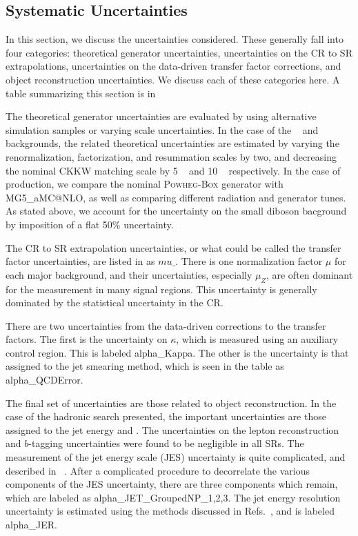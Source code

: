 \subsection{Systematic Uncertainties}

In this section, we discuss the uncertainties considered.
These generally fall into four categories: theoretical generator uncertainties, uncertainties on the CR to SR extrapolations, uncertainties on the data-driven transfer factor corrections, and object reconstruction uncertainties.
We discuss each of these categories here.
A table summarizing this section is in 


The theoretical generator uncertainties are evaluated by using alternative simulation samples or varying scale uncertainties.
In the case of the \zjets~ and \wjets~ backgrounds, the related theoretical uncertainties are estimated by varying the renormalization, factorization, and resummation scales by two, and decreasing the nominal CKKW matching scale by 5 \GeV~ and 10 \GeV~ respectively.
In the case of \ttbar production, we compare the nominal \textsc{Powheg-Box} generator with MG5\_aMC@NLO, as well as comparing different radiation and generator tunes.
As stated above, we account for the uncertainty on the small diboson bacground by imposition of a flat 50\% uncertainty.

The CR to SR extrapolation uncertainties, or what could be called the transfer factor uncertainties, are listed in  as $mu\_$.
There is one normalization factor $\mu$ for each major background, and their uncertainties, especially $\mu_Z$, are often dominant for the measurement in many signal regions.
This uncertainty is generally dominated by the statistical uncertainty in the CR.

There are two uncertainties from the data-driven corrections to the transfer factors.
The first is the uncertainty on $\kappa$, which is measured using an auxiliary \Zll control region.
This is labeled alpha\_Kappa.
The other is the uncertainty is that assigned to the jet smearing method, which is seen in the table as alpha\_QCDError.

The final set of uncertainties are those related to object reconstruction.
In the case of the hadronic search presented, the important uncertainties are those assigned to the jet energy and \met.
The uncertainties on the lepton reconstruction and $b$-tagging uncertainties were found to be negligible in all SRs.
The measurement of the jet energy scale (JES) uncertainty is quite complicated, and described in ~\cite{Aad:2011he,Aad:2012vm,ATL-PHYS-PUB-2015-015}.
After a complicated procedure to decorrelate the various components of the JES uncertainty, there are three components which remain, which are labeled as alpha\_JET\_GroupedNP\_1,2,3.
The jet energy resolution uncertainty is estimated using the methods discussed in Refs.~\cite{Aad:2012ag,ATL-PHYS-PUB-2015-015}, and is labeled alpha\_JER.

